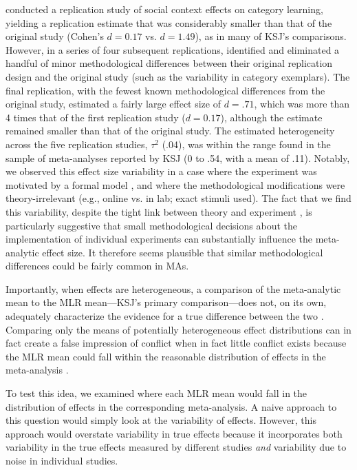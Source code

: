 \documentclass[man,floatsintext]{apa7}
\begin{document}
\Textcite{lewis2016understanding} conducted a replication study of social context effects on category learning, yielding a replication estimate that was considerably smaller than that of the original study (Cohen's $d=0.17$ vs. $d=1.49$), as in many of KSJ's comparisons. However, in a series of four subsequent replications, \Textcite{lewis2016understanding} identified and eliminated a handful of minor methodological differences between their original replication design and the original study (such as the variability in category exemplars). The final replication, with the fewest known methodological differences from the original study, estimated a fairly large effect size of $d=.71$, which was more than 4 times that of the first replication study ($d=0.17$), although the estimate remained smaller than that of the original study. The estimated heterogeneity across the five replication studies,  $\tau^{2}$ (.04), was within the range found in the sample of meta-analyses reported by KSJ (0 to .54, with a mean of .11). Notably, we observed this effect size variability in a case where the experiment was motivated by a formal model \parencite{xu2007word}, and where the methodological modifications were theory-irrelevant (e.g., online vs. in lab; exact stimuli used). The fact that we find this variability, despite the tight link between theory and experiment \parencite{oberauer2019addressing}, is particularly suggestive that small methodological decisions about the implementation of individual experiments can substantially influence the meta-analytic effect size. It therefore seems plausible that similar methodological differences could be fairly common in MAs. 

Importantly, when effects are heterogeneous, a comparison of the meta-analytic mean to the MLR mean---KSJ’s primary comparison---does not, on its own, adequately characterize the evidence for a true difference between the two \parencite{mathur2019new}. Comparing only the means of potentially heterogeneous effect distributions can in fact create a false impression of conflict when in fact little conflict exists because the MLR mean could fall within the reasonable distribution of effects in the meta-analysis \parencite{mathur2019new, mathur2019finding}. 

To test this idea, we examined where each MLR mean would fall in the distribution of effects in the corresponding meta-analysis. A naive approach to this question would simply look at the variability of effects. However, this approach would overstate  variability in true effects because it incorporates both variability in the true effects measured by different studies \emph{and} variability due to noise in individual studies.
\end{document}
